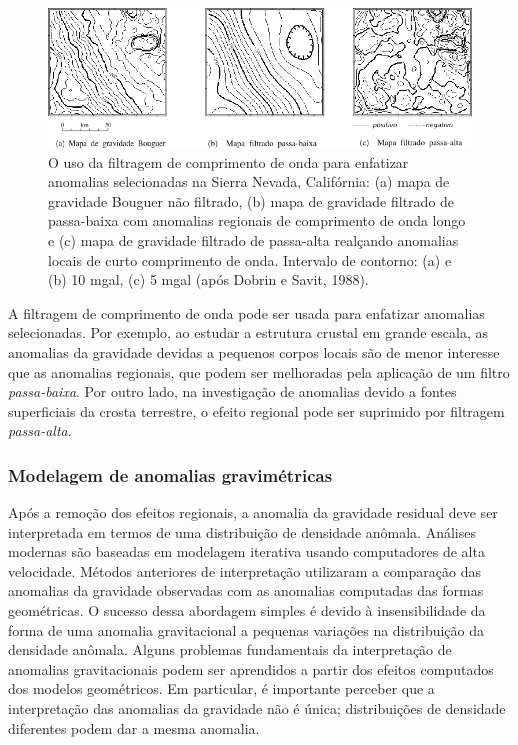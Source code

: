 \documentclass[]{book}
\theoremstyle{definition}
\theoremstyle{definition}
\theoremstyle{definition}
\theoremstyle{remark}
\begin{document}
\begin{figure}

{\centering \includegraphics[width=0.9\linewidth]{fig/Fig_02.41} 

}

\caption{O uso da filtragem de comprimento de onda para enfatizar anomalias selecionadas na Sierra Nevada, Califórnia: (a) mapa de gravidade Bouguer não filtrado, (b) mapa de gravidade filtrado de passa-baixa com anomalias regionais de comprimento de onda longo e (c) mapa de gravidade filtrado de passa-alta realçando anomalias locais de curto comprimento de onda. Intervalo de contorno: (a) e (b) 10 mgal, (c) 5 mgal (após Dobrin e Savit, 1988).}\label{fig:mapafilter}
\end{figure}

A filtragem de comprimento de onda pode ser usada para enfatizar anomalias selecionadas. Por exemplo, ao estudar a estrutura crustal em grande escala, as anomalias da gravidade devidas a pequenos corpos locais são de menor interesse que as anomalias regionais, que podem ser melhoradas pela aplicação de um filtro \emph{passa-baixa}. Por outro lado, na investigação de anomalias devido a fontes superficiais da crosta terrestre, o efeito regional pode ser suprimido por filtragem \emph{passa-alta}.

\hypertarget{modelagem-de-anomalias-gravimetricas}{%
\subsubsection{Modelagem de anomalias gravimétricas}\label{modelagem-de-anomalias-gravimetricas}}

Após a remoção dos efeitos regionais, a anomalia da gravidade residual deve ser interpretada em termos de uma distribuição de densidade anômala. Análises modernas são baseadas em modelagem iterativa usando computadores de alta velocidade. Métodos anteriores de interpretação utilizaram a comparação das anomalias da gravidade observadas com as anomalias computadas das formas geométricas. O sucesso dessa abordagem simples é devido à insensibilidade da forma de uma anomalia gravitacional a pequenas variações na distribuição da densidade anômala. Alguns problemas fundamentais da interpretação de anomalias gravitacionais podem ser aprendidos a partir dos efeitos computados dos modelos geométricos. Em particular, é importante perceber que a interpretação das anomalias da gravidade não é única; distribuições de densidade diferentes podem dar a mesma anomalia.
\end{document}
